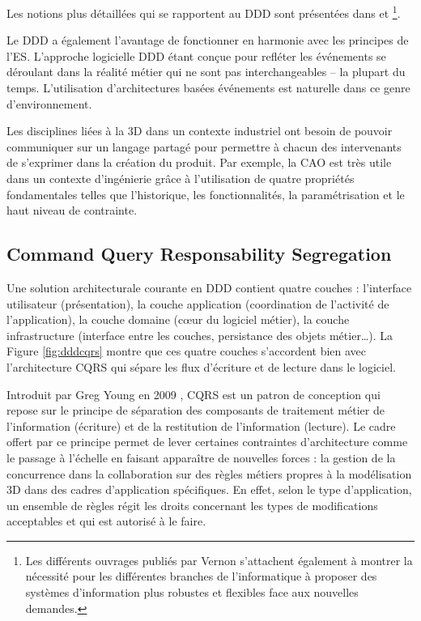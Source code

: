Les notions plus détaillées qui se rapportent au \gls{DDD} sont présentées dans 
\cite{Evans2003} et \cite{Vernon2013}\footnote{Les différents ouvrages publiés par 
Vernon s'attachent également à montrer la nécessité pour les différentes 
branches de l'informatique à proposer des 
systèmes d'information plus robustes et flexibles face aux nouvelles demandes.}.

Le \gls{DDD} a également l'avantage de fonctionner en harmonie avec les 
principes de l'\gls{ES}. L'approche logicielle \gls{DDD} étant conçue pour refléter 
les événements se déroulant dans la réalité métier qui ne sont pas 
interchangeables -- la plupart du temps. L'utilisation d'architectures 
basées événements est naturelle dans ce genre d'environnement. 

Les disciplines liées à la \gls{3D} dans un contexte industriel ont besoin de pouvoir 
communiquer sur un langage partagé pour permettre à chacun des 
intervenants de s'exprimer dans la création du produit. Par exemple, la \gls{CAO} 
est très utile dans un contexte d'ingénierie grâce à l'utilisation de quatre propriétés 
fondamentales telles que l'historique, les fonctionnalités, la paramétrisation et le 
haut niveau de contrainte.



\subsection{Command Query Responsability Segregation}
\label{sec:CQRS}
Une solution architecturale courante en \gls{DDD} contient quatre 
couches : l'interface utilisateur (présentation), la couche application (coordination 
de l'activité de l'application), la couche domaine (c\oe ur du logiciel métier), la 
couche infrastructure (interface entre les couches, persistance des objets 
métier\dots). La Figure \ref{fig:dddcqrs} montre que ces quatre couches s'accordent
bien avec l'architecture \gls{CQRS} qui sépare les flux d'écriture et de lecture dans 
le logiciel.

Introduit par Greg Young en 2009 \cite{Young2009}, \gls{CQRS} est un patron de 
conception qui repose sur le principe de séparation des composants de traitement 
métier de l'information (écriture) et de la restitution de l'information (lecture). Le 
cadre offert par ce principe permet de lever certaines contraintes d'architecture 
comme le passage à l'échelle en faisant apparaître de nouvelles forces : la gestion 
de la concurrence dans la collaboration sur des règles métiers propres à la 
modélisation \gls{3D} dans des cadres d'application spécifiques. En effet, selon le 
type d'application, un ensemble de règles régit les droits concernant les types de 
modifications acceptables et qui est autorisé à le faire.

